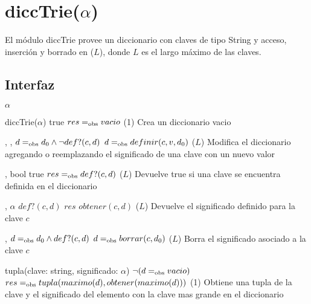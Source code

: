 \section{diccTrie($\alpha$)}

El módulo diccTrie provee un diccionario con claves de tipo String y acceso, inserción y borrado en \bigo($L$), donde $L$ es el largo máximo de las claves.

\subsection{Interfaz}

\begin{iparamformales}{$\alpha$}

\end{iparamformales}

\iusa{}
\ioperaciones

{}
{diccTrie($\alpha$)}
{true}
{$res =_{\mathrm{obs}} vacio$}
{\bigo(1)}
{}
{Crea un diccionario vacio}

{   ,
    ,
    }
{}
{$d =_{\mathrm{obs}} d_0 \land \neg def?(c,d)$}
{$d =_{\mathrm{obs}} definir(c, v, d_0)$}
{\bigo($L$)}
{}
{Modifica el diccionario agregando o reemplazando el significado de una clave 
    con un nuevo valor}

{   ,
    }
{bool}
{true}
{$res =_{\mathrm{obs}} def?(c, d)$}
{\bigo($L$)}
{}
{Devuelve true si una clave se encuentra definida en el diccionario}

{   ,
    }
{$\alpha$}
{$def?(c, d)$}
{$res$ \igobs $obtener(c, d)$}
{\bigo($L$)}
{}
{Devuelve el significado definido para la clave $c$}

{   ,
    }
{}
{$d =_{\mathrm{obs}} d_0 \land def?(c, d)$}
{$d =_{\mathrm{obs}} borrar(c, d_0)$}
{\bigo($L$)}
{}
{Borra el significado asociado a la clave $c$}

{   }
{tupla(clave: string, significado: $\alpha$)}
{$\neg (d =_{\mathrm{obs}} vacio)$}
{$res =_{\mathrm{obs}} tupla(maximo(d), obtener(maximo(d)))$}
{\bigo(1)}
{}
{Obtiene una tupla de la clave y el significado del elemento con la clave 
    mas grande en el diccionario}

